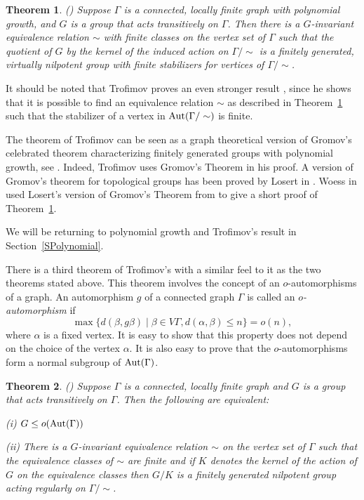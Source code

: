 \documentclass{emsprocart}
\newtheorem{theorem}{Theorem}[section]
\theoremstyle{definition}
\begin{document}
\begin{theorem} \label{TTrofimovPoly}
{\rm (\cite[Theorem~2]{Trofimov1985})}
Suppose $\Gamma$ is a connected, locally finite graph with polynomial
growth, and $G$ is a group that acts transitively on $\Gamma$.
Then there is a $G$-invariant equivalence relation
$\sim$ with finite classes on the vertex set of $\Gamma$
such that the quotient of $G$ by the kernel of the induced
action on $\Gamma/\sim$ is a finitely generated, virtually
nilpotent group with finite stabilizers for vertices of
 $\Gamma/\sim$.

\end{theorem}

It should be noted that Trofimov proves an even stronger result
\cite[Theorem~1]{Trofimov1985}, since
he shows that it is possible to find an equivalence relation
$\sim$ as described in Theorem~\ref{TTrofimovPoly} such that
the stabilizer of a vertex in ${\mbox{${\rm Aut}$}}(\Gamma/\sim)$ is
finite.

The theorem of Trofimov can be seen as a graph theoretical version of
Gromov's celebrated theorem characterizing finitely generated groups
with polynomial growth, see \cite{Gromov1981}.  Indeed, Trofimov
uses Gromov's Theorem in his proof.
A version of
Gromov's theorem for topological groups has been proved by Losert
in \cite{Losert1987}.
Woess in \cite{Woess1992} used Losert's version of Gromov's Theorem
from \cite{Losert1987}
to give a short proof of Theorem~\ref{TTrofimovPoly}.

We will be returning to
polynomial growth and Trofimov's result in Section~\ref{SPolynomial}.

\bigskip

There is a third theorem of Trofimov's with a similar feel to it as the
two theorems stated above.  This theorem involves the concept of
an $o$-automorphisms of a graph.  An automorphism $g$ of a connected graph
$\Gamma$ is called an {\em $o$-automorphism} if
$$\max\{d(\beta, g\beta)\mid \beta\in V\Gamma, d(\alpha,\beta)\leq n\}=o(n),$$
where $\alpha$ is a fixed vertex.  It is easy to show that this property
does not depend on the choice of the vertex $\alpha$.  It is also easy to
prove that the $o$-automorphisms form a normal subgroup of ${\mbox{${\rm Aut}(\Gamma)$}}$.

\begin{theorem} \label{TTrofimovoauto}
{\rm (\cite[Corollary~1]{Trofimov1987})}
Suppose $\Gamma$ is a connected, locally finite graph
and $G$ is a group that acts transitively on $\Gamma$.  Then
the following are equivalent:

(i) $G\leq o({\mbox{${\rm Aut}(\Gamma)$}})$

(ii)  There is a $G$-invariant equivalence relation $\sim$ on the vertex
set of $\Gamma$ such that the equivalence classes of $\sim$ are
finite and
if $K$ denotes the kernel of the action of $G$ on the equivalence
classes then $G/K$ is a finitely generated nilpotent group acting
regularly on $\Gamma/\sim$.
\end{theorem}
\end{document}
